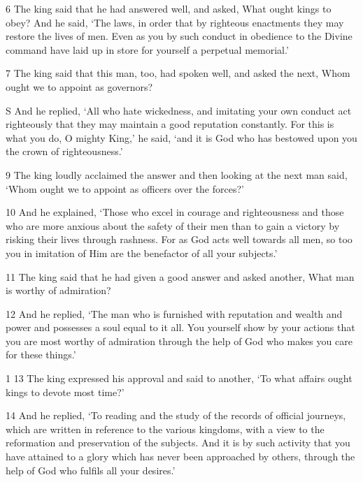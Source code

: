 \par 6 The king said that he had answered well, and asked, What ought kings to obey? And he said, ‘The laws, in order that by righteous enactments they may restore the lives of men. Even as you by such conduct in obedience to the Divine command have laid up in store for yourself a perpetual memorial.’

\par 7 The king said that this man, too, had spoken well, and asked the next, Whom ought we to appoint as governors?

S And he replied, ‘All who hate wickedness, and imitating your own conduct act righteously that they may maintain a good reputation constantly. For this is what you do, O mighty King,’ he said, ‘and it is God who has bestowed upon you the crown of righteousness.’

\par 9 The king loudly acclaimed the answer and then looking at the next man said, ‘Whom ought we to appoint as officers over the forces?’

\par 10 And he explained, ‘Those who excel in courage and righteousness and those who are more anxious about the safety of their men than to gain a victory by risking their lives through rashness. For as God acts well towards all men, so too you in imitation of Him are the benefactor of all your subjects.’

\par 11 The king said that he had given a good answer and asked another, What man is worthy of admiration?

\par 12 And he replied, ‘The man who is furnished with reputation and wealth and power and possesses a soul equal to it all. You yourself show by your actions that you are most worthy of admiration through the help of God who makes you care for these things.’

\par 1 13 The king expressed his approval and said to another, ‘To what affairs ought kings to devote most time?’

\par 14 And he replied, ‘To reading and the study of the records of official journeys, which are written in reference to the various kingdoms, with a view to the reformation and preservation of the subjects. And it is by such activity that you have attained to a glory which has never been approached by others, through the help of God who fulfils all your desires.’


